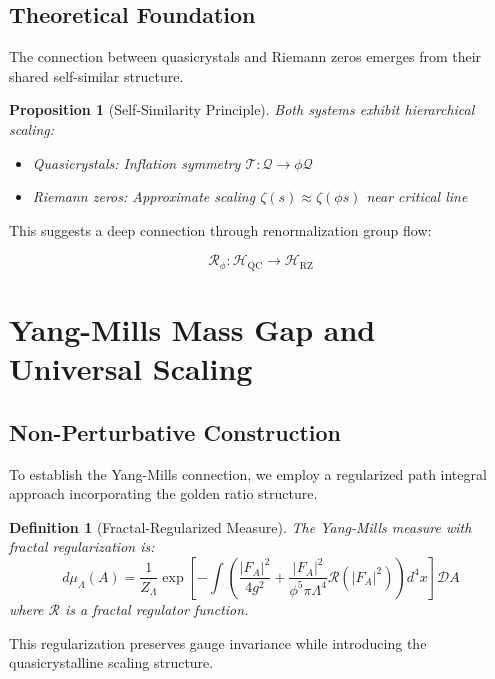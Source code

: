 \documentclass[12pt]{article}
\newtheorem{proposition}[theorem]{Proposition}
\newtheorem{definition}[theorem]{Definition}
\newcommand{\QC}{\text{QC}}
\newcommand{\RZ}{\text{RZ}}
\begin{document}
\subsection{Theoretical Foundation}

The connection between quasicrystals and Riemann zeros emerges from their shared self-similar structure.

\begin{proposition}[Self-Similarity Principle]
Both systems exhibit hierarchical scaling:
\begin{itemize}
\item Quasicrystals: Inflation symmetry $\mathcal{T}: \mathcal{Q} \to \phi \mathcal{Q}$
\item Riemann zeros: Approximate scaling $\zeta(s) \approx \zeta(\phi s)$ near critical line
\end{itemize}
\end{proposition}

This suggests a deep connection through renormalization group flow:

\begin{equation}
\mathcal{R}_\phi: \mathcal{H}_{\QC} \to \mathcal{H}_{\RZ}
\end{equation}

\section{Yang-Mills Mass Gap and Universal Scaling}

\subsection{Non-Perturbative Construction}

To establish the Yang-Mills connection, we employ a regularized path integral approach incorporating the golden ratio structure.

\begin{definition}[Fractal-Regularized Measure]
The Yang-Mills measure with fractal regularization is:
\begin{equation}
d\mu_\Lambda(A) = \frac{1}{Z_\Lambda} \exp\left[-\int \left(\frac{|F_A|^2}{4g^2} + \frac{|F_A|^2}{\phi^5 \pi \Lambda^4}\mathcal{R}(|F_A|^2)\right) d^4x\right] \mathcal{D}A
\end{equation}
where $\mathcal{R}$ is a fractal regulator function.
\end{definition}

This regularization preserves gauge invariance while introducing the quasicrystalline scaling structure.
\end{document}

